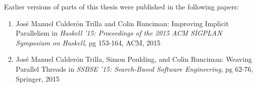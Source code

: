 Earlier versions of parts of this thesis were published in the
following papers:

\begin{enumerate}
    \item Jos\'{e} Manuel Calder\'{o}n Trilla and Colin Runciman: Improving
            Implicit Parallelism in \emph{Haskell '15: Proceedings of the
            2015 ACM SIGPLAN Symposium on Haskell}, pg 153-164, ACM, 2015
    \item Jos\'{e} Manuel Calder\'{o}n Trilla, Simon Poulding, and Colin
            Runciman: Weaving Parallel Threads in \emph{SSBSE '15: Search-Based
            Software Engineering}, pg 62-76, Springer, 2015
\end{enumerate}
